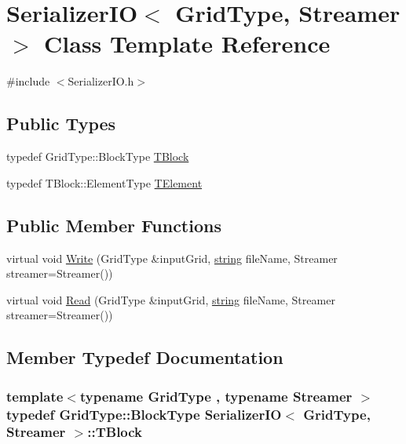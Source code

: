 \hypertarget{class_serializer_i_o}{}\section{Serializer\+I\+O$<$ Grid\+Type, Streamer $>$ Class Template Reference}
\label{class_serializer_i_o}


{\ttfamily \#include $<$Serializer\+I\+O.\+h$>$}

\subsection*{Public Types}
\begin{DoxyCompactItemize}
\item 
typedef Grid\+Type\+::\+Block\+Type \hyperlink{class_serializer_i_o_a7ceedfa7233f4885ae66d00745f2b77b}{T\+Block}
\item 
typedef T\+Block\+::\+Element\+Type \hyperlink{class_serializer_i_o_afdca5fb894f8e5e8a25d57f28acdad7f}{T\+Element}
\end{DoxyCompactItemize}
\subsection*{Public Member Functions}
\begin{DoxyCompactItemize}
\item 
virtual void \hyperlink{class_serializer_i_o_a1d96b41248e5cb866db73715391a7df1}{Write} (Grid\+Type \&input\+Grid, \hyperlink{testfpzip_8cpp_a984bb8e04129c4268bd6ff36a50c9fa4}{string} file\+Name, Streamer streamer=Streamer())
\item 
virtual void \hyperlink{class_serializer_i_o_a50d3ed119bceea19be2fb177495c21f3}{Read} (Grid\+Type \&input\+Grid, \hyperlink{testfpzip_8cpp_a984bb8e04129c4268bd6ff36a50c9fa4}{string} file\+Name, Streamer streamer=Streamer())
\end{DoxyCompactItemize}


\subsection{Member Typedef Documentation}
\hypertarget{class_serializer_i_o_a7ceedfa7233f4885ae66d00745f2b77b}{}
\subsubsection[{T\+Block}]{\setlength{\rightskip}{0pt plus 5cm}template$<$typename Grid\+Type , typename Streamer $>$ typedef Grid\+Type\+::\+Block\+Type {\bf Serializer\+I\+O}$<$ Grid\+Type, Streamer $>$\+::{\bf T\+Block}}\label{class_serializer_i_o_a7ceedfa7233f4885ae66d00745f2b77b}
\hypertarget{class_serializer_i_o_afdca5fb894f8e5e8a25d57f28acdad7f}{}
